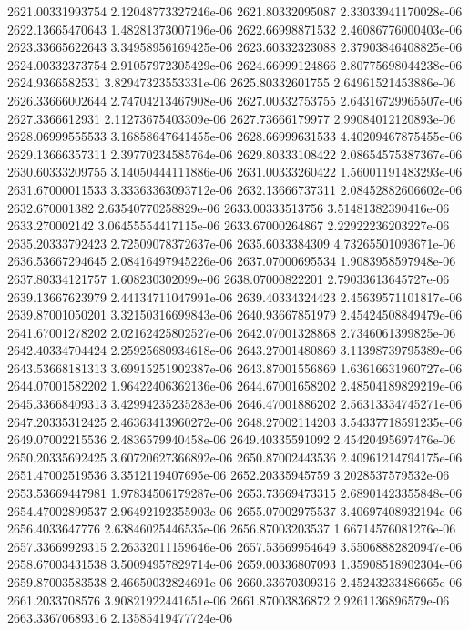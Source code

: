 {2621.00331993754 2.12048773327246e-06
2621.80332095087 2.33033941170028e-06
2622.13665470643 1.48281373007196e-06
2622.66998871532 2.46086776000403e-06
2623.33665622643 3.34958956169425e-06
2623.60332323088 2.37903846408825e-06
2624.00332373754 2.91057972305429e-06
2624.66999124866 2.80775698044238e-06
2624.9366582531 3.82947323553331e-06
2625.80332601755 2.64961521453886e-06
2626.33666002644 2.74704213467908e-06
2627.00332753755 2.64316729965507e-06
2627.3366612931 2.11273675403309e-06
2627.73666179977 2.99084012120893e-06
2628.06999555533 3.16858647641455e-06
2628.66999631533 4.40209467875455e-06
2629.13666357311 2.39770234585764e-06
2629.80333108422 2.08654575387367e-06
2630.60333209755 3.14050444111886e-06
2631.00333260422 1.56001191483293e-06
2631.67000011533 3.33363363093712e-06
2632.13666737311 2.08452882606602e-06
2632.670001382 2.63540770258829e-06
2633.00333513756 3.51481382390416e-06
2633.270002142 3.06455554417115e-06
2633.67000264867 2.22922236203227e-06
2635.20333792423 2.72509078372637e-06
2635.6033384309 4.73265501093671e-06
2636.53667294645 2.08416497945226e-06
2637.07000695534 1.9083958597948e-06
2637.80334121757 1.608230302099e-06
2638.07000822201 2.79033613645727e-06
2639.13667623979 2.44134711047991e-06
2639.40334324423 2.45639571101817e-06
2639.87001050201 3.32150316699843e-06
2640.93667851979 2.45424508849479e-06
2641.67001278202 2.02162425802527e-06
2642.07001328868 2.7346061399825e-06
2642.40334704424 2.25925680934618e-06
2643.27001480869 3.11398739795389e-06
2643.53668181313 3.69915251902387e-06
2643.87001556869 1.63616631960727e-06
2644.07001582202 1.96422406362136e-06
2644.67001658202 2.48504189829219e-06
2645.33668409313 3.42994235235283e-06
2646.47001886202 2.56313334745271e-06
2647.20335312425 2.46363413960272e-06
2648.27002114203 3.54337718591235e-06
2649.07002215536 2.4836579940458e-06
2649.40335591092 2.45420495697476e-06
2650.20335692425 3.60720627366892e-06
2650.87002443536 2.40961214794175e-06
2651.47002519536 3.3512119407695e-06
2652.20335945759 3.2028537579532e-06
2653.53669447981 1.97834506179287e-06
2653.73669473315 2.68901423355848e-06
2654.47002899537 2.96492192355903e-06
2655.07002975537 3.40697408932194e-06
2656.4033647776 2.63846025446535e-06
2656.87003203537 1.66714576081276e-06
2657.33669929315 2.26332011159646e-06
2657.53669954649 3.55068882820947e-06
2658.67003431538 3.50094957829714e-06
2659.00336807093 1.35908518902304e-06
2659.87003583538 2.46650032824691e-06
2660.33670309316 2.45243233486665e-06
2661.2033708576 3.90821922441651e-06
2661.87003836872 2.9261136896579e-06
2663.33670689316 2.13585419477724e-06
}
